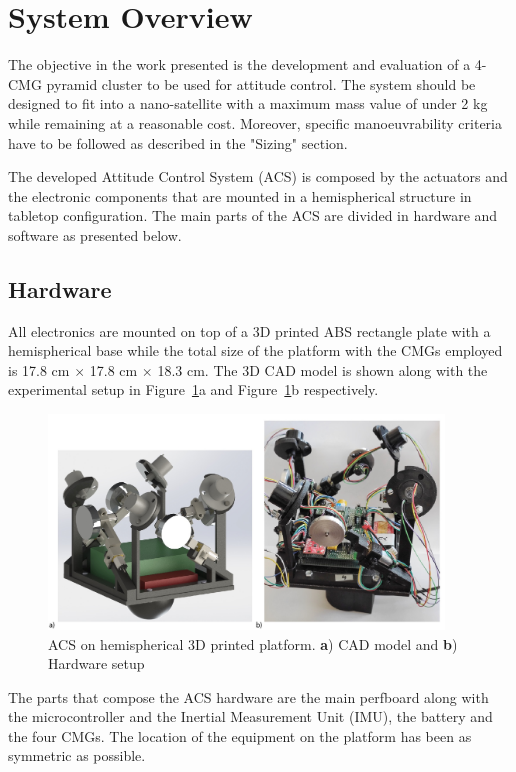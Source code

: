 \documentclass[aerospace,article,submit,moreauthors,dvi2pdf]{Definitions/mdpi}
\begin{document}
 
\section{System Overview}
The objective in the work presented is the development and evaluation of a 4-CMG pyramid cluster to be used for attitude control. The system should be designed to fit into a nano-satellite with a maximum mass value of under 2 kg while remaining at a reasonable cost. Moreover, specific manoeuvrability criteria have to be followed as described in the "Sizing" section. 

The developed Attitude Control System (ACS) is composed by the actuators and the electronic components that are mounted in a hemispherical structure in tabletop configuration. The main parts of the ACS are divided in hardware and software as presented below.
\subsection{Hardware}
All electronics are mounted on top of a 3D printed ABS rectangle plate with a hemispherical base while the total size of the platform with the CMGs employed is 17.8 cm $\times$ 17.8 cm $\times$ 18.3 cm. The 3D CAD model is shown along with the experimental setup in Figure~\ref{fig:myACS}a and Figure~\ref{fig:myACS}b respectively.

\begin{figure}[H]
\includegraphics[width=10.5cm]{cadvsmyacs.jpg}
\caption{ACS on hemispherical 3D printed platform. \textbf{a}) CAD model and \textbf{b}) Hardware setup \label{fig:myACS}}
\end{figure}

The parts that compose the ACS hardware are the main perfboard along with the microcontroller and the Inertial Measurement Unit (IMU), the battery and the four CMGs. The location of the equipment on the platform has been as symmetric as possible.
\end{document}
